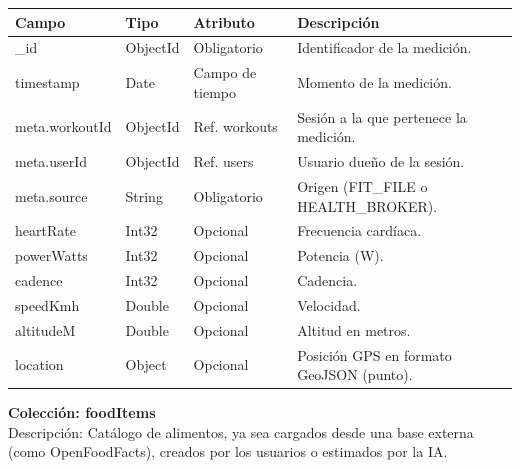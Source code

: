 {\footnotesize
\renewcommand{\arraystretch}{1.2}
\begin{longtable}{|>{\raggedright\arraybackslash}p{4.7cm}|>{\raggedright\arraybackslash}p{1.8cm}|>{\raggedright\arraybackslash}p{2.3cm}|>{\raggedright\arraybackslash}p{5.4cm}|}
    \hline
    \rowcolor[HTML]{EFEFEF}
    \textbf{Campo} & \textbf{Tipo} & \textbf{Atributo} & \textbf{Descripción} \\ \hline
    \endhead
    \_id & ObjectId & Obligatorio & Identificador de la medición. \\ \hline
    timestamp & Date & Campo de tiempo & Momento de la medición. \\ \hline
    meta.\allowbreak workoutId & ObjectId & Ref. workouts & Sesión a la que pertenece la medición. \\ \hline
    meta.\allowbreak userId & ObjectId & Ref. users & Usuario dueño de la sesión. \\ \hline
    meta.\allowbreak source & String & Obligatorio & Origen (FIT\_FILE o HEALTH\_BROKER). \\ \hline
    heartRate & Int32 & Opcional & Frecuencia cardíaca. \\ \hline
    powerWatts & Int32 & Opcional & Potencia (W). \\ \hline
    cadence & Int32 & Opcional & Cadencia. \\ \hline
    speedKmh & Double & Opcional & Velocidad. \\ \hline
    altitudeM & Double & Opcional & Altitud en metros. \\ \hline
    location & Object & Opcional & Posición GPS en formato GeoJSON (punto). \\ \hline
\end{longtable}
}
\noindent\textbf{Colección: foodItems} \\
Descripción: Catálogo de alimentos, ya sea cargados desde una base externa (como OpenFoodFacts), creados por los usuarios o estimados por la IA.
